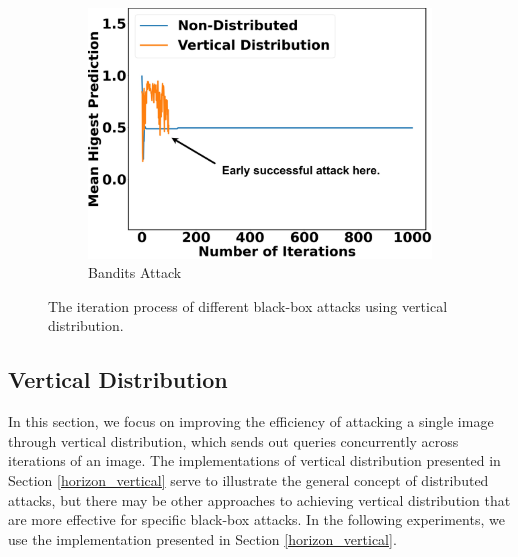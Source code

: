 \begin{figure}[tp]
\begin{subfigure}[b]{0.32\textwidth}
    \includegraphics[width=\textwidth]{figures/chapter_classification/bandits_attack_vertical_margin.png}
    \caption{Bandits Attack}
    \label{fig:bandits_plot}
\end{subfigure}
\caption{The iteration process of different black-box attacks using vertical distribution.}
\label{fig.vertical_plot}
\end{figure}


\subsection{Vertical Distribution}

In this section, we focus on improving the efficiency of attacking a single image through vertical distribution, which sends out queries concurrently across iterations of an image. The implementations of vertical distribution presented in Section \ref{horizon_vertical} serve to illustrate the general concept of distributed attacks, but there may be other approaches to achieving vertical distribution that are more effective for specific black-box attacks. In the following experiments, we use the implementation presented in Section \ref{horizon_vertical}.


